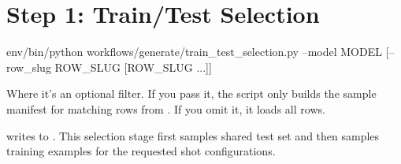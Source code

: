 \documentclass[11pt]{article}
\begin{document}
\section*{Step 1: Train/Test Selection}
\begin{DocCode}
env/bin/python workflows/generate/train_test_selection.py --model MODEL [--row_slug ROW_SLUG [ROW_SLUG ...]]
\end{DocCode}
Where  it's an optional filter.  
If you pass it, the script only builds the sample manifest for matching rows from . 
If you omit it, it loads all rows.

 writes to .
This selection stage first samples shared test set and then samples training examples for the requested shot configurations. 
\end{document}

